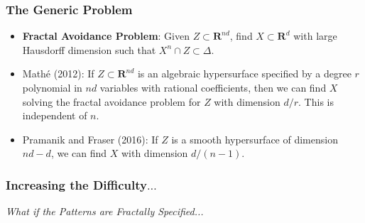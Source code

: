 \documentclass[handout,usenames,dvipsnames]{beamer}
\begin{document}
\begin{frame}
    \frametitle{The Generic Problem}

    \begin{itemize}
        \item {\bf Fractal Avoidance Problem}: Given $Z \subset \mathbf{R}^{nd}$, find $X \subset \mathbf{R}^d$ with large Hausdorff dimension such that $X^n \cap Z \subset \Delta$.

        \pause
        \item Math\'{e} (2012): If $Z \subset \mathbf{R}^{nd}$ is an algebraic hypersurface specified by a degree $r$ polynomial in $nd$ variables with rational coefficients, then we can find $X$ solving the fractal avoidance problem for $Z$ with dimension $d/r$. This is independent of $n$.

        \pause
        \item Pramanik and Fraser (2016): If $Z$ is a smooth hypersurface of dimension $nd - d$, we can find $X$ with dimension $d/(n-1)$.
    \end{itemize}
\end{frame}

\begin{frame}
    \frametitle{Increasing the Difficulty$\dots$}

    \begin{center}
     \Huge {\it What if the Patterns are Fractally Specified...}
    \end{center}
\end{frame}






\end{document}
